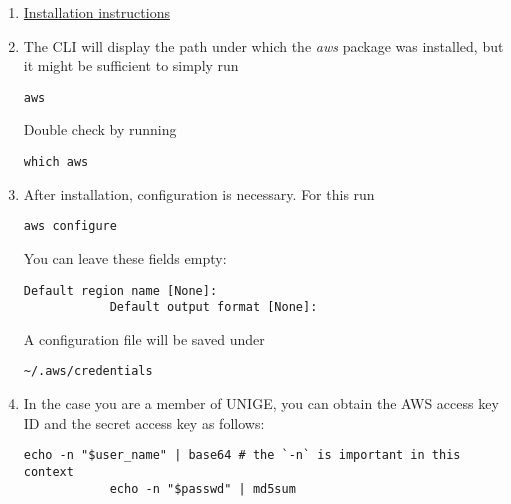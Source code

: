 \documentclass[12pt, a4paper]{scrbook}
\numberwithin{equation}{section}
\theoremstyle{definition}
\theoremstyle{definition}
\begin{document}
	\begin{enumerate}
		\item \href{https://docs.aws.amazon.com/cli/latest/userguide/getting-started-install.html#getting-started-install-instructions}{Installation instructions}
		\item The CLI will display the path under which the \textit{aws} package was installed, but it might be sufficient to simply run 
		
		\begin{lstlisting}[style=mystylebash, label=alg:aws, xleftmargin=\parindent]
			aws
		\end{lstlisting}
		
		Double check by running 
		
		\begin{lstlisting}[style=mystylebash, label=alg:aws_path, xleftmargin=\parindent]
			which aws
		\end{lstlisting}
		
		\item After installation, configuration is necessary. For this run
		
		\begin{lstlisting}[style=mystylebash, label=alg:aws_configure, xleftmargin=\parindent]
			aws configure
		\end{lstlisting}
		
		You can leave these fields empty:
		
		\begin{lstlisting}[style=mystylebash, label=alg:aws_configure__default_reg, xleftmargin=\parindent]
			Default region name [None]:
			Default output format [None]:
		\end{lstlisting}
		
		A configuration file will be saved under 
		
		\begin{lstlisting}[style=mystylebash, label=alg:aws__config_file, xleftmargin=\parindent]
			~/.aws/credentials
		\end{lstlisting}
		
		\item In the case you are a member of UNIGE, you can obtain the AWS access key ID and the secret access key as follows:
		
		\begin{lstlisting}[style=mystylebash, label=alg:aws__access_secret_key, xleftmargin=\parindent]
			echo -n "$user_name" | base64 # the `-n` is important in this context
			echo -n "$passwd" | md5sum
		\end{lstlisting}
		

\end{enumerate}
\end{document}
